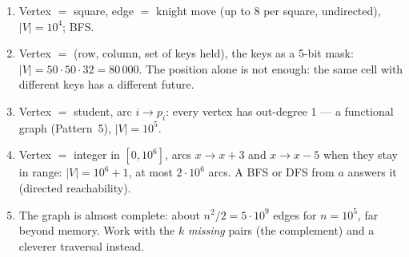 \begin{solutionbox}[Answers]
\begin{enumerate}[leftmargin=*]
    \item Vertex $=$ square, edge $=$ knight move (up to 8 per square, undirected), $|V|=10^4$; BFS.
    \item Vertex $=$ (row, column, set of keys held), the keys as a 5-bit mask: $|V|=50\cdot50\cdot32=80\,000$. The position alone is not enough: the same cell with different keys has a different future.
    \item Vertex $=$ student, arc $i\to p_i$: every vertex has out-degree 1 --- a functional graph (Pattern~5), $|V|=10^5$.
    \item Vertex $=$ integer in $[0,10^6]$, arcs $x\to x+3$ and $x\to x-5$ when they stay in range: $|V|=10^6+1$, at most $2\cdot10^6$ arcs. A BFS or DFS from $a$ answers it (directed reachability).
    \item The graph is almost complete: about $n^2/2 = 5\cdot10^9$ edges for $n=10^5$, far beyond memory. Work with the $k$ \emph{missing} pairs (the complement) and a cleverer traversal instead.
\end{enumerate}
\end{solutionbox}
